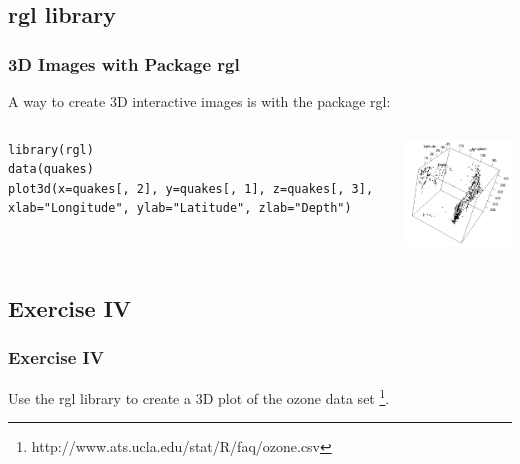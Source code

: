 \subsection{\ttfamily rgl \normalfont library} 
\begin{frame}[fragile]
\frametitle{3D Images with Package \ttfamily rgl \normalfont}

A way to create 3D interactive images is with the package \ttfamily rgl: \normalfont 

    \begin{columns}
\begin{lstlisting}
library(rgl)
data(quakes)
plot3d(x=quakes[, 2], y=quakes[, 1], z=quakes[, 3], xlab="Longitude", ylab="Latitude", zlab="Depth")
\end{lstlisting}

       \begin{center}
\includegraphics[width = 55mm]{images/Fiji_RGL}
\end{center}
\end{columns}
\end{frame}


\subsection{Exercise IV}
\begin{frame}
	\frametitle{Exercise IV}
	Use the \ttfamily rgl \normalfont library to create a 3D plot of the \ttfamily ozone \normalfont data set \footnote{\ttfamily http://www.ats.ucla.edu/stat/R/faq/ozone.csv\normalfont}.
\end{frame}